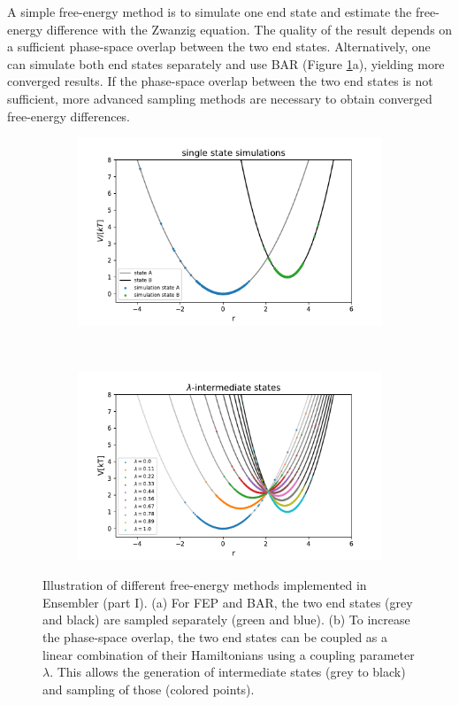 A simple free-energy method is to simulate one end state and estimate the free-energy difference with the Zwanzig equation.\cite{Zwanzig1954} The quality of the result depends on a sufficient phase-space overlap between the two end states.\cite{Konig2018}
Alternatively, one can simulate both end states separately and use BAR\cite{Bennett1976} (Figure \ref{fig:FE_sampling}a), yielding more converged results.\cite{Konig2018}
If the phase-space overlap between the two end states is not sufficient, more advanced sampling methods are necessary to obtain converged free-energy differences.
%
\begin{figure}[H]
	\centering
	\begin{subfigure}{.85\textwidth}
		\caption{}
		\includegraphics[width=\linewidth]{fig/FE_example/freeEnergyPertubation.pdf} 
	\end{subfigure}\\
	\begin{subfigure}{.85\textwidth}
		\caption{}
		\includegraphics[width=\linewidth]{fig/FE_example/linear_coupled.pdf} 
	\end{subfigure}
	\caption{Illustration of different free-energy methods implemented in Ensembler (part I). (a) For FEP\cite{Zwanzig1954} and BAR\cite{Bennett1976}, the two end states (grey and black) are sampled separately (green and blue). (b) To increase the phase-space overlap, the two end states can be coupled as a linear combination of their Hamiltonians using a coupling parameter $\lambda$. This allows the generation of intermediate states (grey to black) and sampling of those (colored points).}
	\label{fig:FE_sampling}
\end{figure}
